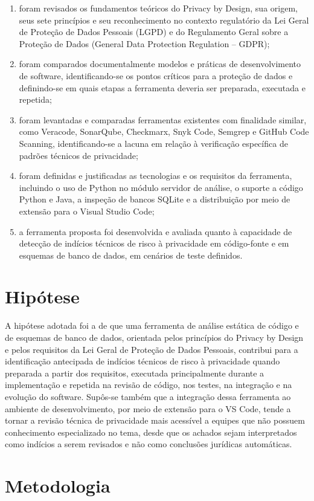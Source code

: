 \documentclass[12pt,a4paper,oneside]{report}
\newcommand{\secaointro}[1]{\section*{#1}\addcontentsline{toc}{section}{#1}}
\begin{document}
\begin{enumerate}
\item foram revisados os fundamentos teóricos do Privacy by Design, sua origem, seus sete princípios e seu reconhecimento no contexto regulatório da Lei Geral de Proteção de Dados Pessoais (LGPD) e do Regulamento Geral sobre a Proteção de Dados (General Data Protection Regulation -- GDPR);
\item foram comparados documentalmente modelos e práticas de desenvolvimento de software, identificando-se os pontos críticos para a proteção de dados e definindo-se em quais etapas a ferramenta deveria ser preparada, executada e repetida;
\item foram levantadas e comparadas ferramentas existentes com finalidade similar, como Veracode, SonarQube, Checkmarx, Snyk Code, Semgrep e GitHub Code Scanning, identificando-se a lacuna em relação à verificação específica de padrões técnicos de privacidade;
\item foram definidas e justificadas as tecnologias e os requisitos da ferramenta, incluindo o uso de Python no módulo servidor de análise, o suporte a código Python e Java, a inspeção de bancos SQLite e a distribuição por meio de extensão para o Visual Studio Code;
\item a ferramenta proposta foi desenvolvida e avaliada quanto à capacidade de detecção de indícios técnicos de risco à privacidade em código-fonte e em esquemas de banco de dados, em cenários de teste definidos.
\end{enumerate}

\secaointro{Hipótese}

A hipótese adotada foi a de que uma ferramenta de análise estática de código e de esquemas de banco de dados, orientada pelos princípios do Privacy by Design e pelos requisitos da Lei Geral de Proteção de Dados Pessoais, contribui para a identificação antecipada de indícios técnicos de risco à privacidade quando preparada a partir dos requisitos, executada principalmente durante a implementação e repetida na revisão de código, nos testes, na integração e na evolução do software. Supôs-se também que a integração dessa ferramenta ao ambiente de desenvolvimento, por meio de extensão para o VS Code, tende a tornar a revisão técnica de privacidade mais acessível a equipes que não possuem conhecimento especializado no tema, desde que os achados sejam interpretados como indícios a serem revisados e não como conclusões jurídicas automáticas.

\secaointro{Metodologia}
\end{document}

